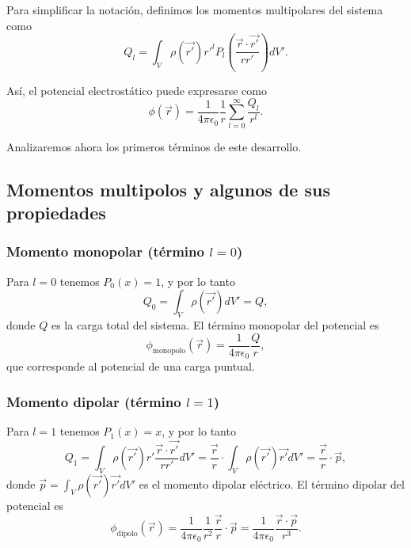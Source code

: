 \documentclass[12pt,a4paper]{book}
\begin{document}
Para simplificar la notación, definimos los momentos multipolares del sistema como
\begin{equation}
Q_l = \int_V \rho(\vec{r'})r'^l P_l\left(\frac{\vec{r}\cdot\vec{r'}}{rr'}\right) dV'.
\end{equation}

Así, el potencial electrostático puede expresarse como
\begin{equation}
\phi(\vec{r}) = \frac{1}{4\pi\epsilon_0}\frac{1}{r}\sum_{l=0}^{\infty}\frac{Q_l}{r^l}.
\end{equation}

Analizaremos ahora los primeros términos de este desarrollo.

\subsection{Momentos multipolos y algunos de sus propiedades}

\subsubsection{Momento monopolar (término $l=0$)}

Para $l=0$ tenemos $P_0(x) = 1$, y por lo tanto
\begin{equation}
Q_0 = \int_V \rho(\vec{r'}) dV' = Q,
\end{equation}
donde $Q$ es la carga total del sistema. El término monopolar del potencial es
\begin{equation}
\phi_{\text{monopolo}}(\vec{r}) = \frac{1}{4\pi\epsilon_0}\frac{Q}{r},
\end{equation}
que corresponde al potencial de una carga puntual.

\subsubsection{Momento dipolar (término $l=1$)}

Para $l=1$ tenemos $P_1(x) = x$, y por lo tanto
\begin{equation}
Q_1 = \int_V \rho(\vec{r'})r' \frac{\vec{r}\cdot\vec{r'}}{rr'} dV' = \frac{\vec{r}}{r}\cdot\int_V \rho(\vec{r'})\vec{r'} dV' = \frac{\vec{r}}{r}\cdot\vec{p},
\end{equation}
donde $\vec{p} = \int_V \rho(\vec{r'})\vec{r'} dV'$ es el momento dipolar eléctrico. El término dipolar del potencial es
\begin{equation}
\phi_{\text{dipolo}}(\vec{r}) = \frac{1}{4\pi\epsilon_0}\frac{1}{r^2}\frac{\vec{r}}{r}\cdot\vec{p} = \frac{1}{4\pi\epsilon_0}\frac{\vec{r}\cdot\vec{p}}{r^3}.
\end{equation}
\end{document}
